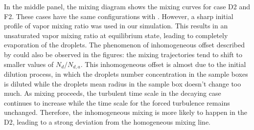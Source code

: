\documentclass[draft,jgrga]{AGUTeX}
\begin{document}
\begin{article}
In the middle panel, the mixing diagram shows the mixing curves for case D2 and F2. These cases have the same configurations with \cite{Kumar14}. However, a sharp initial profile of vapor mixing ratio was used in our simulation. This results in an unsaturated vapor mixing ratio at equilibrium state, leading to completely evaporation of the droplets. The phenomenon of inhomogeneous offset described by \cite{Kumar14} could also be observed in the figures: the mixing trajectories tend to shift to smaller values of $N_d/N_{d,a}$. This inhomogeneous offset is almost due to the initial dilution process, in which the droplets number concentration in the sample boxes is diluted while the droplets mean radius in the sample box doesn't change too much. As mixing proceeds, the turbulent time scale in the decaying case continues to increase while the time scale for the forced turbulence remains unchanged. Therefore, the inhomogeneous mixing is more likely to happen in the D2, leading to a strong deviation from the homogeneous mixing line.


\end{article}
\end{document}
